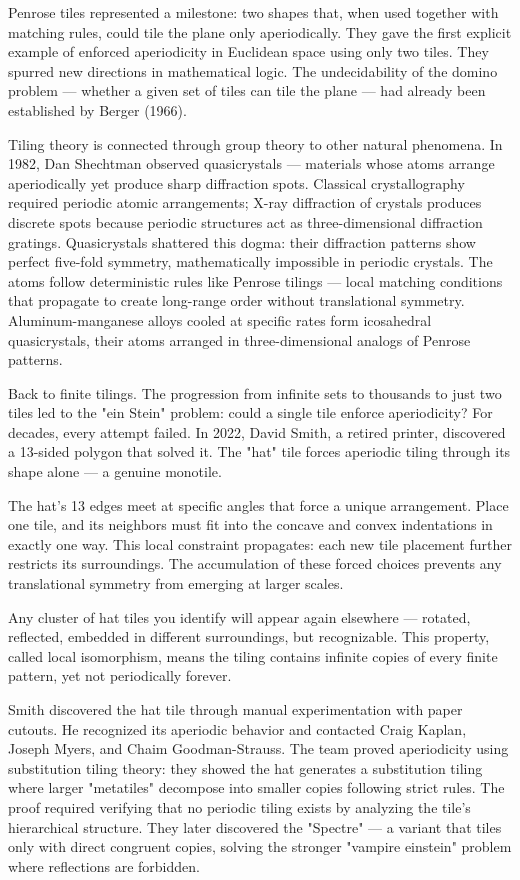 Penrose tiles represented a milestone: two shapes that, when used together with matching rules, could tile the plane only aperiodically. They gave the first explicit example of enforced aperiodicity in Euclidean space using only two tiles. They spurred new directions in mathematical logic. The undecidability of the domino problem — whether a given set of tiles can tile the plane — had already been established by Berger (1966).

Tiling theory is connected through group theory to other natural phenomena. In 1982, Dan Shechtman observed quasicrystals — materials whose atoms arrange aperiodically yet produce sharp diffraction spots. Classical crystallography required periodic atomic arrangements; X-ray diffraction of crystals produces discrete spots because periodic structures act as three-dimensional diffraction gratings. Quasicrystals shattered this dogma: their diffraction patterns show perfect five-fold symmetry, mathematically impossible in periodic crystals. The atoms follow deterministic rules like Penrose tilings — local matching conditions that propagate to create long-range order without translational symmetry. Aluminum-manganese alloys cooled at specific rates form icosahedral quasicrystals, their atoms arranged in three-dimensional analogs of Penrose patterns.

Back to finite tilings. The progression from infinite sets to thousands to just two tiles led to the "ein Stein" problem: could a single tile enforce aperiodicity? For decades, every attempt failed. In 2022, David Smith, a retired printer, discovered a 13-sided polygon that solved it. The "hat" tile forces aperiodic tiling through its shape alone — a genuine monotile.

The hat's 13 edges meet at specific angles that force a unique arrangement. Place one tile, and its neighbors must fit into the concave and convex indentations in exactly one way. This local constraint propagates: each new tile placement further restricts its surroundings. The accumulation of these forced choices prevents any translational symmetry from emerging at larger scales.

Any cluster of hat tiles you identify will appear again elsewhere — rotated, reflected, embedded in different surroundings, but recognizable. This property, called local isomorphism, means the tiling contains infinite copies of every finite pattern, yet not periodically forever.

Smith discovered the hat tile through manual experimentation with paper cutouts. He recognized its aperiodic behavior and contacted Craig Kaplan, Joseph Myers, and Chaim Goodman-Strauss. The team proved aperiodicity using substitution tiling theory: they showed the hat generates a substitution tiling where larger "metatiles" decompose into smaller copies following strict rules. The proof required verifying that no periodic tiling exists by analyzing the tile's hierarchical structure. They later discovered the "Spectre" — a variant that tiles only with direct congruent copies, solving the stronger "vampire einstein" problem where reflections are forbidden.

